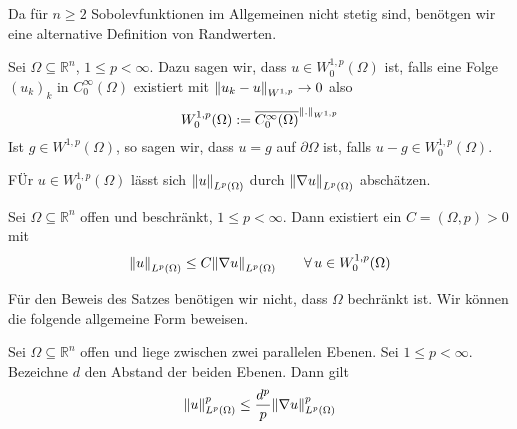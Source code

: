 Da für $n \geq 2$ Sobolevfunktionen im Allgemeinen nicht stetig sind, benötgen wir eine alternative Definition von Randwerten.
\begin{definition*}
	Sei $\Omega \subseteq \mathbb{R}^n$, $1 \leq p < \infty$. Dazu sagen wir, dass $u \in W_0^{1,p}(\Omega)$ ist, falls eine Folge $(u_k)_k$ in $C_0^{\infty}(\Omega)$
	existiert mit $\norm{u_k - u}_{W^{1,p}} \to 0$ also
	\[
		W_0^{1,p}(\Omega) := \overline{C_0^{\infty}(\Omega)}^{\norm{.}_{W^{1,p}}}
	\]
	Ist $g \in W^{1,p}(\Omega)$, so sagen wir, dass $u=g$ auf $\partial \Omega$ ist, falls $u-g \in W_0^{1,p}(\Omega)$.
\end{definition*}
FÜr $u \in W_0^{1,p}(\Omega)$ lässt sich $\norm{u}_{L^p(\Omega)}$ durch $\norm{ \nabla u}_{L^p(\Omega)}$ abschätzen.

\begin{satz}
	Sei $\Omega \subseteq \mathbb{R}^n$ offen und beschränkt, $1 \leq p < \infty$. Dann existiert ein $C = (\Omega, p) >0$ mit 
	\[
		\norm{u}_{L^p(\Omega)} \leq C \norm{ \nabla u}_{L^p(\Omega)} \qquad \forall\, u \in W_0^{1,p}(\Omega)
	\]
\end{satz}
\begin{bemerkung}
	Für den Beweis des Satzes benötigen wir nicht, dass $\Omega$ bechränkt ist. Wir können die folgende allgemeine Form beweisen.
\end{bemerkung}
\begin{satz}
	Sei $\Omega \subseteq  \mathbb{R}^n$ offen und liege zwischen zwei parallelen Ebenen. Sei $1 \leq p < \infty$. Bezeichne $d$ den Abstand der beiden Ebenen. Dann gilt
	\[
		\norm{u}_{L^p(\Omega)}^p \leq \frac{d^p}{p} \norm{ \nabla u}^p_{L^p(\Omega)}
	\]
\end{satz}
